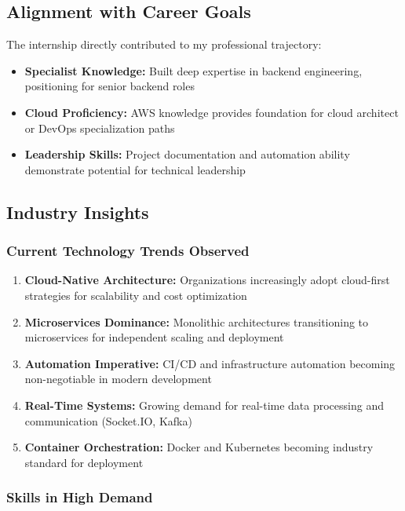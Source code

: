 \subsection{Alignment with Career Goals}

The internship directly contributed to my professional trajectory:

\begin{itemize}
    \item \textbf{Specialist Knowledge:} Built deep expertise in backend engineering, positioning for senior backend roles
    \item \textbf{Cloud Proficiency:} AWS knowledge provides foundation for cloud architect or DevOps specialization paths
    \item \textbf{Leadership Skills:} Project documentation and automation ability demonstrate potential for technical leadership
\end{itemize}

\subsection{Industry Insights}

\subsubsection{Current Technology Trends Observed}

\begin{enumerate}
    \item \textbf{Cloud-Native Architecture:} Organizations increasingly adopt cloud-first strategies for scalability and cost optimization
    \item \textbf{Microservices Dominance:} Monolithic architectures transitioning to microservices for independent scaling and deployment
    \item \textbf{Automation Imperative:} CI/CD and infrastructure automation becoming non-negotiable in modern development
    \item \textbf{Real-Time Systems:} Growing demand for real-time data processing and communication (Socket.IO, Kafka)
    \item \textbf{Container Orchestration:} Docker and Kubernetes becoming industry standard for deployment
\end{enumerate}

\subsubsection{Skills in High Demand}

